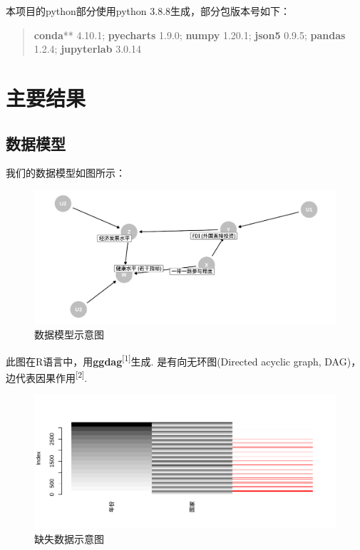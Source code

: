 \documentclass[]{ctexart}
\begin{document}
本项目的python部分使用python 3.8.8生成，部分包版本号如下：

\begin{quote}
\textbf{conda}** 4.10.1; \textbf{pyecharts} 1.9.0; \textbf{numpy}
1.20.1; \textbf{json5} 0.9.5; \textbf{pandas} 1.2.4; \textbf{jupyterlab}
3.0.14
\end{quote}

\hypertarget{ux4e3bux8981ux7ed3ux679c}{%
\section{主要结果}\label{ux4e3bux8981ux7ed3ux679c}}

\hypertarget{ux6570ux636eux6a21ux578b}{%
\subsection{数据模型}\label{ux6570ux636eux6a21ux578b}}

我们的数据模型如图所示：

\begin{figure}

{\centering \includegraphics[width=0.65\linewidth,height=0.6\textheight]{resources/DAG} 

}

\caption{数据模型示意图}\label{fig:unnamed-chunk-3}
\end{figure}

此图在R语言中，用\textbf{ggdag}\textsuperscript{{[}1{]}}生成.
是有向无环图(Directed acyclic graph,
DAG)，边代表因果作用\textsuperscript{{[}2{]}}.

\begin{figure}

{\centering \includegraphics[width=0.65\linewidth,height=0.6\textheight]{resources/Missing data} 

}

\caption{缺失数据示意图}\label{fig:unnamed-chunk-4}
\end{figure}
\end{document}
